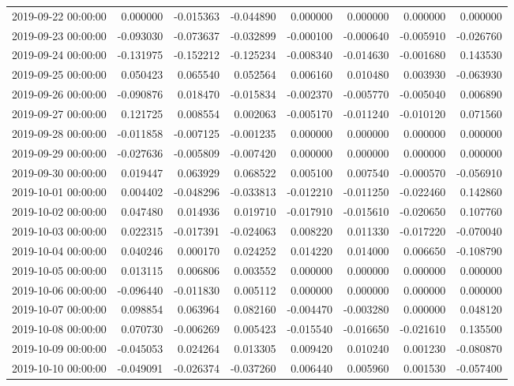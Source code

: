 \begin{tabular}{lrrrrrrr}
2019-09-22 00:00:00 & 0.000000 & -0.015363 & -0.044890 & 0.000000 & 0.000000 & 0.000000 & 0.000000 \\
2019-09-23 00:00:00 & -0.093030 & -0.073637 & -0.032899 & -0.000100 & -0.000640 & -0.005910 & -0.026760 \\
2019-09-24 00:00:00 & -0.131975 & -0.152212 & -0.125234 & -0.008340 & -0.014630 & -0.001680 & 0.143530 \\
2019-09-25 00:00:00 & 0.050423 & 0.065540 & 0.052564 & 0.006160 & 0.010480 & 0.003930 & -0.063930 \\
2019-09-26 00:00:00 & -0.090876 & 0.018470 & -0.015834 & -0.002370 & -0.005770 & -0.005040 & 0.006890 \\
2019-09-27 00:00:00 & 0.121725 & 0.008554 & 0.002063 & -0.005170 & -0.011240 & -0.010120 & 0.071560 \\
2019-09-28 00:00:00 & -0.011858 & -0.007125 & -0.001235 & 0.000000 & 0.000000 & 0.000000 & 0.000000 \\
2019-09-29 00:00:00 & -0.027636 & -0.005809 & -0.007420 & 0.000000 & 0.000000 & 0.000000 & 0.000000 \\
2019-09-30 00:00:00 & 0.019447 & 0.063929 & 0.068522 & 0.005100 & 0.007540 & -0.000570 & -0.056910 \\
2019-10-01 00:00:00 & 0.004402 & -0.048296 & -0.033813 & -0.012210 & -0.011250 & -0.022460 & 0.142860 \\
2019-10-02 00:00:00 & 0.047480 & 0.014936 & 0.019710 & -0.017910 & -0.015610 & -0.020650 & 0.107760 \\
2019-10-03 00:00:00 & 0.022315 & -0.017391 & -0.024063 & 0.008220 & 0.011330 & -0.017220 & -0.070040 \\
2019-10-04 00:00:00 & 0.040246 & 0.000170 & 0.024252 & 0.014220 & 0.014000 & 0.006650 & -0.108790 \\
2019-10-05 00:00:00 & 0.013115 & 0.006806 & 0.003552 & 0.000000 & 0.000000 & 0.000000 & 0.000000 \\
2019-10-06 00:00:00 & -0.096440 & -0.011830 & 0.005112 & 0.000000 & 0.000000 & 0.000000 & 0.000000 \\
2019-10-07 00:00:00 & 0.098854 & 0.063964 & 0.082160 & -0.004470 & -0.003280 & 0.000000 & 0.048120 \\
2019-10-08 00:00:00 & 0.070730 & -0.006269 & 0.005423 & -0.015540 & -0.016650 & -0.021610 & 0.135500 \\
2019-10-09 00:00:00 & -0.045053 & 0.024264 & 0.013305 & 0.009420 & 0.010240 & 0.001230 & -0.080870 \\
2019-10-10 00:00:00 & -0.049091 & -0.026374 & -0.037260 & 0.006440 & 0.005960 & 0.001530 & -0.057400 \\

\end{tabular}
